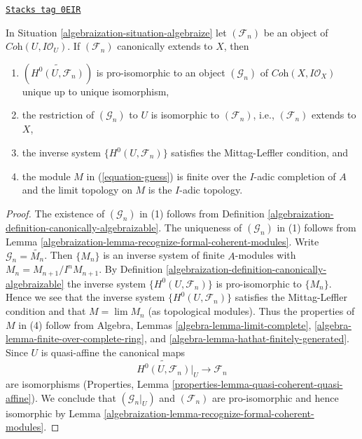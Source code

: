 \begin{lemma}
\label{algebraization-lemma-canonically-algebraizable}
\href{https://stacks.math.columbia.edu/tag/0EIR}{\texttt{Stacks tag 0EIR}}

In Situation \ref{algebraization-situation-algebraize} let $(\mathcal{F}_n)$ be an
object of $\textit{Coh}(U, I\mathcal{O}_U)$. If $(\mathcal{F}_n)$
canonically extends to $X$, then
\begin{enumerate}
\item $(\widetilde{H^0(U, \mathcal{F}_n)})$ is pro-isomorphic to an
object $(\mathcal{G}_n)$ of $\textit{Coh}(X, I \mathcal{O}_X)$
unique up to unique isomorphism,
\item the restriction of $(\mathcal{G}_n)$ to $U$ is isomorphic
to $(\mathcal{F}_n)$, i.e., $(\mathcal{F}_n)$ extends to $X$,
\item the inverse system $\{H^0(U, \mathcal{F}_n)\}$
satisfies the Mittag-Leffler condition, and
\item the module $M$ in (\ref{equation-guess}) is finite over the
$I$-adic completion of $A$ and the limit topology on
$M$ is the $I$-adic topology.
\end{enumerate}
\end{lemma}

\begin{proof}

The existence of $(\mathcal{G}_n)$ in (1) follows from
Definition \ref{algebraization-definition-canonically-algebraizable}.
The uniqueness of $(\mathcal{G}_n)$ in (1) follows from
Lemma \ref{algebraization-lemma-recognize-formal-coherent-modules}.
Write $\mathcal{G}_n = \widetilde{M_n}$.
Then $\{M_n\}$ is an inverse system of finite $A$-modules
with $M_n = M_{n + 1}/I^n M_{n + 1}$.
By Definition \ref{algebraization-definition-canonically-algebraizable}
the inverse system $\{H^0(U, \mathcal{F}_n)\}$
is pro-isomorphic to $\{M_n\}$.
Hence we see that the inverse system $\{H^0(U, \mathcal{F}_n)\}$
satisfies the Mittag-Leffler condition and that
$M = \lim M_n$ (as topological modules).
Thus the properties of $M$ in (4) follow from
Algebra, Lemmas \ref{algebra-lemma-limit-complete},
\ref{algebra-lemma-finite-over-complete-ring}, and
\ref{algebra-lemma-hathat-finitely-generated}.
Since $U$ is quasi-affine the canonical maps
$$
\widetilde{H^0(U, \mathcal{F}_n)}|_U \to \mathcal{F}_n
$$
are isomorphisms (Properties, Lemma
\ref{properties-lemma-quasi-coherent-quasi-affine}).
We conclude that $(\mathcal{G}_n|_U)$ and $(\mathcal{F}_n)$ are
pro-isomorphic and hence isomorphic by
Lemma \ref{algebraization-lemma-recognize-formal-coherent-modules}.
\end{proof}


